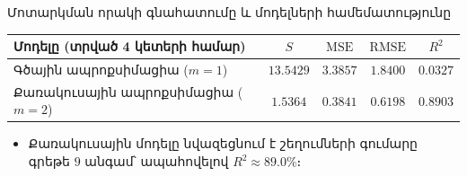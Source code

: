 \documentclass[aspectratio=169,11pt]{beamer}
\begin{document}
\begin{frame}{Մոտարկման որակի գնահատումը և մոդելների համեմատությունը}
    \begin{table}
        \centering
        \small
        \renewcommand{\arraystretch}{1.35}
        \begin{tabular}{@{}lcccc@{}}
            \toprule
            \textbf{Մոդելը (տրված 4 կետերի համար)} & $S$ & $\mathrm{MSE}$ & $\mathrm{RMSE}$ & $R^2$ \\
            \midrule
            Գծային ապրոքսիմացիա ($m = 1$) & $13.5429$ & $3.3857$ & $1.8400$ & $0.0327$ \\
            Քառակուսային ապրոքսիմացիա ($m = 2$) & $1.5364$ & $0.3841$ & $0.6198$ & $0.8903$ \\
            \bottomrule
        \end{tabular}
    \end{table}

    \begin{itemize}
        \item Քառակուսային մոդելը նվազեցնում է շեղումների գումարը գրեթե $9$ անգամ՝ ապահովելով $R^2 \approx 89.0\%$։
    \end{itemize}
\end{frame}
\end{document}
